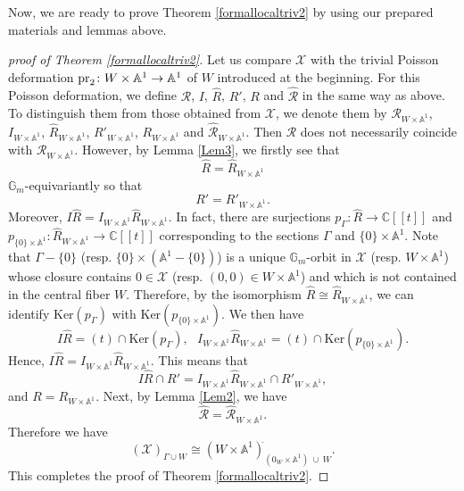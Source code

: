 \documentclass[12pt,a4paper]{amsart}
\theoremstyle{remark}
\theoremstyle{definition}
\def\C{\mathbb{C}}
\def\G{\mathbb{G}}
\def\A{\mathbb{A}}
\def\X{\mathcal{X}}
\begin{document}
Now, we are ready to prove Theorem \ref{formallocaltriv2} 
by using our prepared materials and lemmas above. 

\begin{proof}[proof of Theorem \ref{formallocaltriv2}]
Let us compare $\X$ with the trivial 
Poisson deformation ${\rm pr}_2\colon W \times \A^1 \to \A^1$ of $W$ introduced at the beginning.  
For this Poisson deformation, we define 
$\mathcal{R}$, $I$, $\hat{R}$, $R'$, $R$ and $\hat{\mathcal R}$ in the same way as above.  
To distinguish them from those obtained from $\mathcal{X}$, we denote them by 
$\mathcal{R}_{W \times \A^1}$, $I_{W \times \A^1}$, $\hat{R}_{W \times \A^1}$, $R'_{W \times \A^1}$, $R_{W \times \A^1}$ and $\hat{\mathcal R}_{W \times \A^1}$. 
Then $\mathcal{R}$ does not necessarily coincide with $\mathcal{R}_{W \times \A^1}$.  
However, by Lemma \ref{Lem3}, we firstly see that $$\hat{R} = \hat{R}_{W \times \A^1}$$ $\G_m$-equivariantly so that 
$$R' = R'_{W \times \A^1}.$$ 
Moreover, $I\hat{R} = I_{W \times \A^1}\hat{R}_{W \times \A^1}$. In fact, there are surjections 
$p_{\Gamma}: \hat{R} \to \C[[t]]$ and $p_{\{0\} \times \A^1}: \hat{R}_{W \times \A^1} \to \C[[t]]$ corresponding to the sections $\Gamma$ and $\{0\} \times \A^1$. Note that $\Gamma - \{0\}$ (resp. $\{0\} \times (\A^1 - \{0\})$) is a unique $\G_m$-orbit in 
$\mathcal{X}$ (resp. $W \times \A^1$) whose closure contains $0 \in \mathcal{X}$ (resp. $(0,0) \in W \times \A^1$) and which is not contained in the central fiber $W$.  Therefore, 
by the isomorphism $\hat{R} \cong \hat{R}_{W \times \A^1}$, we can identify $\mathrm{Ker}(p_{\Gamma})$ with $\mathrm{Ker}(p_{\{0\} \times \A^1})$. We then have  
$$I\hat{R} = (t) \cap \mathrm{Ker}(p_{\Gamma}), \:\:\:  
I_{W \times \A^1}\hat{R}_{W \times \A^1} = (t) \cap \mathrm{Ker}(p_{\{0\} \times \A^1}).$$  
Hence, $I\hat{R} = I_{W \times \A^1}\hat{R}_{W \times \A^1}$. This means that $$I\hat{R} \cap R' = 
I_{W \times \A^1}\hat{R}_{W \times \A^1} \cap R'_{W \times \A^1},$$ and   
$R = R_{W \times \A^1}$.  Next, by Lemma \ref{Lem2}, we have  $$\hat{\mathcal R}  = \hat{\mathcal R}_{W \times \A^1}.$$ 
Therefore we have   
$$(\mathcal{X})^{\hat{}}_{\Gamma \cup W} \cong 
(W \times \A^1)^{\hat{}}_{(0_W \times \A^1)\: \cup \: W}.$$
This completes the proof of Theorem \ref{formallocaltriv2}.   
\end{proof}
\end{document}
